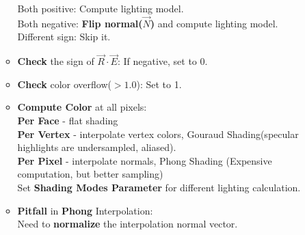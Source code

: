 \documentclass[cyan,normal,en]{elegantnote}
\begin{document}
\begin{enumerate}
\begin{itemize}
		Both positive: Compute lighting model.\\
		Both negative: \textbf{Flip normal($\vec{N}$)} and compute lighting model.\\
		Different sign: Skip it.
		\item \textbf{Check} the sign of \textbf{$\vec{R}\cdot\vec{E}$}: If negative, set to 0.
		\item \textbf{Check} color overflow($>1.0$): Set to 1.
		\item \textbf{Compute Color} at all pixels:\\
		\textbf{Per Face} - flat shading\\
		\textbf{Per Vertex} - interpolate vertex colors, Gouraud Shading(specular highlights are undersampled, aliased).\\
		\textbf{Per Pixel} - interpolate normals, Phong Shading (Expensive computation, but better sampling)\\
		Set \textbf{Shading Modes Parameter} for different lighting calculation.
		\item \textbf{Pitfall} in \textbf{Phong} Interpolation:\\
		Need to \textbf{normalize} the interpolation normal vector.
	\end{itemize}
\end{enumerate}
\end{document}
